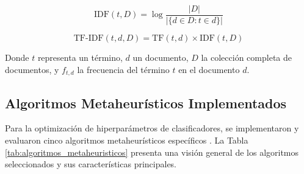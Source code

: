 \begin{equation}
\text{IDF}(t,D) = \log\frac{|D|}{|\{d \in D : t \in d\}|}
\end{equation}

\begin{equation}
\text{TF-IDF}(t,d,D) = \text{TF}(t,d) \times \text{IDF}(t,D)
\end{equation}

Donde $t$ representa un término, $d$ un documento, $D$ la colección completa de documentos, y $f_{t,d}$ la frecuencia del término $t$ en el documento $d$.

\subsection{Algoritmos Metaheurísticos Implementados}

Para la optimización de hiperparámetros de clasificadores, se implementaron y evaluaron cinco algoritmos metaheurísticos específicos \cite{hurtado2024calibracion, bacanin2023benefits}. La Tabla \ref{tab:algoritmos_metaheuristicos} presenta una visión general de los algoritmos seleccionados y sus características principales.

